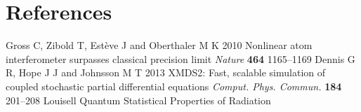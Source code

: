 \documentclass[12pt]{iopart}
\begin{document}
\section*{References}
\begin{thebibliography}{10}
 Gross C, Zibold T, Est{\`{e}}ve J and Oberthaler M K 2010 Nonlinear atom interferometer surpasses classical
precision limit {\it Nature} {\bf 464} 1165--1169
 Dennis G R, Hope J J and Johnsson M T 2013 XMDS2: Fast, scalable simulation of coupled stochastic partial
differential equations {\it Comput. Phys. Commun.} {\bf 184} 201--208
 Louisell Quantum Statistical Properties of Radiation
\end{thebibliography}
\end{document}
